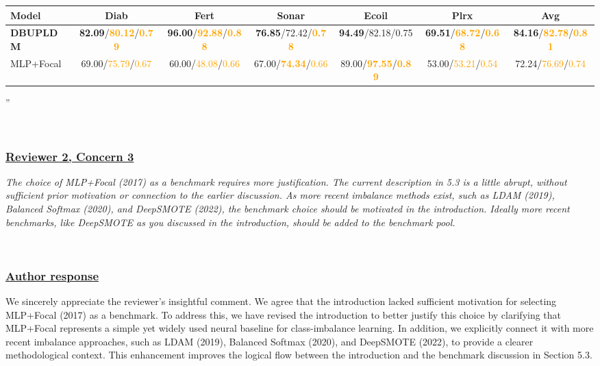 \documentclass[journal,12pn, onecolumn]{IEEEtran}
\begin{document}
{{{{\begin{table}[htbp]
{\begin{tabular}{lcccccc}
    \midrule
    \textbf{Model} & Diab & Fert & Sonar & Ecoil & Plrx & Avg \\
    \midrule
    \textbf{DBUPLDM} & \textbf{82.09}/\textbf{\textcolor{orange}{80.12}}/\textbf{\textcolor{orange}{0.79}} & \textbf{96.00}/\textbf{\textcolor{orange}{92.88}}/\textbf{\textcolor{orange}{0.88}} & \textbf{76.85}/{\color{orange}72.42}/\textbf{\textcolor{orange}{0.78}} & \textbf{94.49}/{\color{orange}82.18}/{\color{orange}0.75} & \textbf{69.51}/\textbf{\textcolor{orange}{68.72}}/\textbf{\textcolor{orange}{0.68}} & \textbf{84.16}/\textbf{\textcolor{orange}{82.78}}/\textbf{\textcolor{orange}{0.81}} \\
    MLP+Focal        & 69.00/\textcolor{orange}{75.79}/\textcolor{orange}{0.67} & 60.00/\textcolor{orange}{48.08}/\textcolor{orange}{0.66} & 67.00/\textbf{\textcolor{orange}{74.34}}/\textcolor{orange}{0.66} & 89.00/\textbf{\textcolor{orange}{97.55}}/\textbf{\textcolor{orange}{0.89}} & 53.00/\textcolor{orange}{53.21}/\textcolor{orange}{0.54} & 72.24/\textcolor{orange}{76.69}/\textcolor{orange}{0.74} \\
    \bottomrule
    \end{tabular}
  }
  \label{tab:performance_comparison2}
\end{table}''}\\



\textcolor{customgreen}{
\subsubsection*{\underline{\textbf{Reviewer 2, Concern 3}}}
\emph{The choice of MLP+Focal (2017) as a benchmark requires more justification. The current description in 5.3 is a little abrupt, without sufficient prior motivation or connection to the earlier discussion. As more recent imbalance methods exist, such as LDAM (2019), Balanced Softmax (2020), and DeepSMOTE (2022), the benchmark choice should be motivated in the introduction. Ideally more recent benchmarks, like DeepSMOTE as you discussed in the introduction, should be added to the benchmark pool.}
}\\

{\color{black}
\subsubsection*{\textbf{\underline{Author response}}}
We sincerely appreciate the reviewer’s insightful comment. We agree that the introduction lacked sufficient motivation for selecting MLP+Focal (2017) as a benchmark. To address this, we have revised the introduction to better justify this choice by clarifying that MLP+Focal represents a simple yet widely used neural baseline for class-imbalance learning. In addition, we explicitly connect it with more recent imbalance approaches, such as LDAM (2019), Balanced Softmax (2020), and DeepSMOTE (2022), to provide a clearer methodological context. This enhancement improves the logical flow between the introduction and the benchmark discussion in Section 5.3.
}\\

}}}
\end{document}
